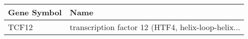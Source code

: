 \begin{tabular}{ll}
\toprule
Gene Symbol &                                               Name \\
\midrule
      TCF12 & transcription factor 12 (HTF4, helix-loop-helix... \\
\bottomrule
\end{tabular}
